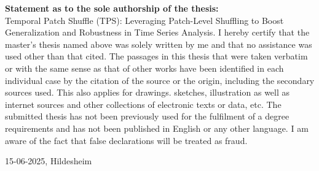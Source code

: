 \documentclass[a4paper,12pt]{report}
\begin{document}


\setcounter{secnumdepth}{2} %


\noindent \textbf{Statement as to the sole authorship of the thesis:}
\vspace{0.4cm}
\\Temporal Patch Shuffle (TPS): Leveraging Patch-Level Shuffling to Boost Generalization and Robustness in Time Series Analysis.
I hereby certify that the master's thesis named above was solely written by me and that no assistance was used other than that cited. The passages in this thesis that were taken verbatim or with the same sense as that of other works have been identified in each individual case by the citation of the source or the origin, including the secondary sources used. This also applies for drawings. sketches, illustration as well as internet sources and other collections of electronic texts or data, etc. The submitted thesis has not been previously used for the fulfilment of a degree requirements and has not been published in English or any other language. I am aware of the fact that false declarations will be treated as fraud.
\vspace{7cm}


15-06-2025, Hildesheim

\thispagestyle{empty}
\setcounter{tocdepth}{2}
\newpage

\end{document}

